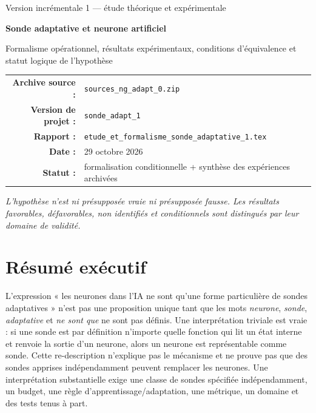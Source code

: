 \documentclass[11pt,a4paper,oneside]{report}
\begin{document}
\hypersetup{pageanchor=false}
\begin{titlepage}
\centering
{\Large Version incrémentale 1 — étude théorique et expérimentale}\par\vspace{1.0cm}
{\Huge\bfseries Sonde adaptative et neurone artificiel}\par\vspace{0.5cm}
{\LARGE Formalisme opérationnel, résultats expérimentaux, conditions d'équivalence et statut logique de l'hypothèse}\par\vspace{1.4cm}
\begin{tabular}{rl}
\textbf{Archive source :} & \texttt{sources\_ng\_adapt\_0.zip}\\
\textbf{Version de projet :} & \texttt{sonde\_adapt\_1}\\
\textbf{Rapport :} & \texttt{etude\_et\_formalisme\_sonde\_adaptative\_1.tex}\\
\textbf{Date :} & 29 octobre 2026\\
\textbf{Statut :} & formalisation conditionnelle + synthèse des expériences archivées
\end{tabular}
\vfill
\textit{L'hypothèse n'est ni présupposée vraie ni présupposée fausse. Les résultats favorables, défavorables, non identifiés et conditionnels sont distingués par leur domaine de validité.}
\end{titlepage}
\hypersetup{pageanchor=true}
\tableofcontents
\clearpage
{}
\chapter*{Résumé exécutif}
L'expression « les neurones dans l'IA ne sont qu'une forme particulière de sondes adaptatives » n'est pas une proposition unique tant que les mots \emph{neurone}, \emph{sonde}, \emph{adaptative} et \emph{ne sont que} ne sont pas définis. Une interprétation triviale est vraie : si une sonde est par définition n'importe quelle fonction qui lit un état interne et renvoie la sortie d'un neurone, alors un neurone est représentable comme sonde. Cette re-description n'explique pas le mécanisme et ne prouve pas que des sondes apprises indépendamment peuvent remplacer les neurones. Une interprétation substantielle exige une classe de sondes spécifiée indépendamment, un budget, une règle d'apprentissage/adaptation, une métrique, un domaine et des tests tenus à part.
\end{document}
